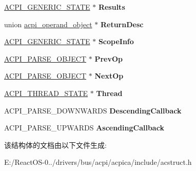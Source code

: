 \begin{DoxyCompactItemize}
\hyperlink{unionacpi__generic__state}{A\+C\+P\+I\+\_\+\+G\+E\+N\+E\+R\+I\+C\+\_\+\+S\+T\+A\+TE} $\ast$ {\bfseries Results}
\item 
\mbox{\label{structacpi__walk__state_a205d0e36ee82baa0a5c9ea22902c0cd9}} 
union \hyperlink{unionacpi__operand__object}{acpi\+\_\+operand\+\_\+object} $\ast$ {\bfseries Return\+Desc}
\item 
\mbox{\label{structacpi__walk__state_a7518fa28a04829d2a1bfefb68c84a29a}} 
\hyperlink{unionacpi__generic__state}{A\+C\+P\+I\+\_\+\+G\+E\+N\+E\+R\+I\+C\+\_\+\+S\+T\+A\+TE} $\ast$ {\bfseries Scope\+Info}
\item 
\mbox{\label{structacpi__walk__state_a9eaed20f286ac8136b78cbb8149f2e24}} 
\hyperlink{unionacpi__parse__object}{A\+C\+P\+I\+\_\+\+P\+A\+R\+S\+E\+\_\+\+O\+B\+J\+E\+CT} $\ast$ {\bfseries Prev\+Op}
\item 
\mbox{\label{structacpi__walk__state_a78f59bb38a9843c79d0df5a9a3b5fb3a}} 
\hyperlink{unionacpi__parse__object}{A\+C\+P\+I\+\_\+\+P\+A\+R\+S\+E\+\_\+\+O\+B\+J\+E\+CT} $\ast$ {\bfseries Next\+Op}
\item 
\mbox{\label{structacpi__walk__state_af8ea55ac6b66b04cc972fa0aa32c3a77}} 
\hyperlink{structacpi__thread__state}{A\+C\+P\+I\+\_\+\+T\+H\+R\+E\+A\+D\+\_\+\+S\+T\+A\+TE} $\ast$ {\bfseries Thread}
\item 
\mbox{\label{structacpi__walk__state_a776c2cd4ac075ae7e6ca4894c721d68f}} 
A\+C\+P\+I\+\_\+\+P\+A\+R\+S\+E\+\_\+\+D\+O\+W\+N\+W\+A\+R\+DS {\bfseries Descending\+Callback}
\item 
\mbox{\label{structacpi__walk__state_acc5a481c08b2c666af66d59310663f9f}} 
A\+C\+P\+I\+\_\+\+P\+A\+R\+S\+E\+\_\+\+U\+P\+W\+A\+R\+DS {\bfseries Ascending\+Callback}
\end{DoxyCompactItemize}


该结构体的文档由以下文件生成\+:\begin{DoxyCompactItemize}
\item 
E\+:/\+React\+O\+S-\/0../drivers/bus/acpi/acpica/include/acstruct.\+h\end{DoxyCompactItemize}
